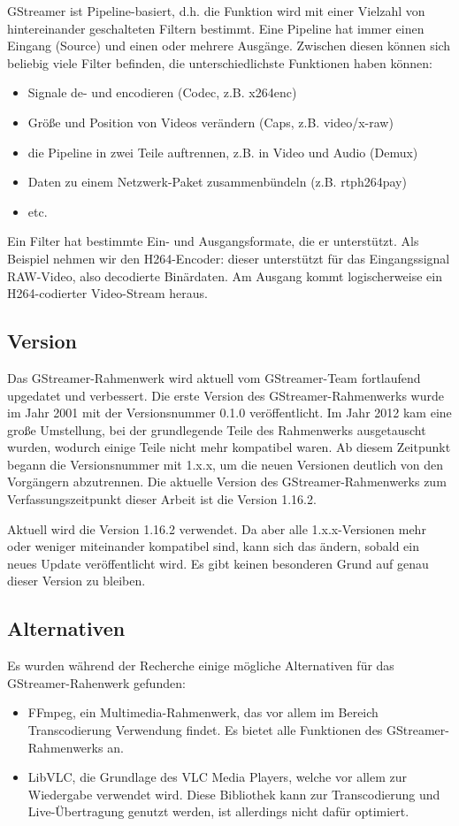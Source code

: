 GStreamer ist Pipeline-basiert, d.h. die Funktion wird mit einer Vielzahl von hintereinander geschalteten Filtern bestimmt.
Eine Pipeline hat immer einen Eingang (Source) und einen oder mehrere Ausgänge.
Zwischen diesen können sich beliebig viele Filter befinden, die unterschiedlichste Funktionen haben können:
\begin{itemize}
    \item Signale de- und encodieren (Codec, z.B. x264enc)
    \item Größe und Position von Videos verändern (Caps, z.B. video/x-raw)
    \item die Pipeline in zwei Teile auftrennen, z.B. in Video und Audio (Demux)
    \item Daten zu einem Netzwerk-Paket zusammenbündeln (z.B. rtph264pay)
    \item etc.
\end{itemize}
Ein Filter hat bestimmte Ein- und Ausgangsformate, die er unterstützt.
Als Beispiel nehmen wir den H264-Encoder:
dieser unterstützt für das Eingangssignal RAW-Video, also decodierte Binärdaten. Am Ausgang kommt logischerweise ein H264-codierter Video-Stream heraus.\par

\subsection{Version}
Das GStreamer-Rahmenwerk wird aktuell vom GStreamer-Team fortlaufend upgedatet und verbessert.
Die erste Version des GStreamer-Rahmenwerks wurde im Jahr 2001 mit der Versionsnummer 0.1.0 veröffentlicht.
Im Jahr 2012 kam eine große Umstellung, bei der grundlegende Teile des Rahmenwerks ausgetauscht wurden, wodurch einige Teile nicht mehr kompatibel waren.
Ab diesem Zeitpunkt begann die Versionsnummer mit 1.x.x, um die neuen Versionen deutlich von den Vorgängern abzutrennen.
Die aktuelle Version des GStreamer-Rahmenwerks zum Verfassungszeitpunkt dieser Arbeit ist die Version 1.16.2.\par

Aktuell wird die Version 1.16.2 verwendet. Da aber alle 1.x.x-Versionen mehr oder weniger miteinander kompatibel sind, kann sich das ändern, sobald ein neues Update veröffentlicht wird. Es gibt keinen besonderen Grund auf genau dieser Version zu bleiben.\par

\subsection{Alternativen}
Es wurden während der Recherche einige mögliche Alternativen für das GStreamer-Rahenwerk gefunden:
\begin{itemize}
    \item FFmpeg, ein Multimedia-Rahmenwerk, das vor allem im Bereich Transcodierung Verwendung findet. Es bietet alle Funktionen des GStreamer-Rahmenwerks an.
    \item LibVLC, die Grundlage des VLC Media Players, welche vor allem zur Wiedergabe verwendet wird. Diese Bibliothek kann zur Transcodierung und Live-Übertragung genutzt werden, ist allerdings nicht dafür optimiert.
\end{itemize}

